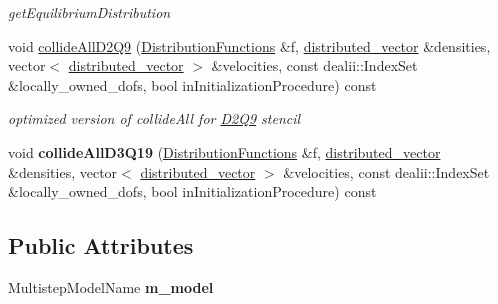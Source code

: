 \begin{DoxyCompactItemize}
\begin{DoxyCompactList}\small\item\em getEquilibriumDistribution \item\end{DoxyCompactList}\item 
void \hyperlink{classnatrium_1_1BGKMultistep_abc9c762511c5dd75a4fc238584a0bc0a}{collideAllD2Q9} (\hyperlink{classnatrium_1_1DistributionFunctions}{DistributionFunctions} \&f, \hyperlink{namespacenatrium_a903d2b92917f582f2ff05f52160ab811}{distributed\_\-vector} \&densities, vector$<$ \hyperlink{namespacenatrium_a903d2b92917f582f2ff05f52160ab811}{distributed\_\-vector} $>$ \&velocities, const dealii::IndexSet \&locally\_\-owned\_\-dofs, bool inInitializationProcedure) const 
\begin{DoxyCompactList}\small\item\em optimized version of collideAll for \hyperlink{classnatrium_1_1D2Q9}{D2Q9} stencil \item\end{DoxyCompactList}\item 
\hypertarget{classnatrium_1_1BGKMultistep_a9b3e71906a2b4399dd048f90c26e2f6a}{
void {\bfseries collideAllD3Q19} (\hyperlink{classnatrium_1_1DistributionFunctions}{DistributionFunctions} \&f, \hyperlink{namespacenatrium_a903d2b92917f582f2ff05f52160ab811}{distributed\_\-vector} \&densities, vector$<$ \hyperlink{namespacenatrium_a903d2b92917f582f2ff05f52160ab811}{distributed\_\-vector} $>$ \&velocities, const dealii::IndexSet \&locally\_\-owned\_\-dofs, bool inInitializationProcedure) const }
\label{classnatrium_1_1BGKMultistep_a9b3e71906a2b4399dd048f90c26e2f6a}

\end{DoxyCompactItemize}
\subsection*{Public Attributes}
\begin{DoxyCompactItemize}
\item 
\hypertarget{classnatrium_1_1BGKMultistep_a23bb03ead6e625d4a2f2830398928a38}{
MultistepModelName {\bfseries m\_\-model}}
\label{classnatrium_1_1BGKMultistep_a23bb03ead6e625d4a2f2830398928a38}

\end{DoxyCompactItemize}


